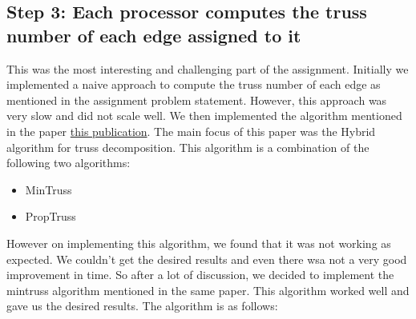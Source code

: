 \documentclass{article}
\begin{document}
\subsection{Step 3: Each processor computes the truss number of each edge assigned to it}

This was the most interesting and challenging part of the assignment. Initially we implemented a naive approach to compute the truss number of each edge as mentioned in the assignment problem statement. However, this approach was very slow and did not scale well. We then implemented the algorithm mentioned in the paper \href{https://link.springer.com/chapter/10.1007/978-3-319-96983-1_50}{this publication}. The main focus of this paper was the Hybrid algorithm for truss decomposition. This algorithm is a combination of the following two algorithms:
\begin{itemize}
    \item MinTruss
    \item PropTruss
\end{itemize}

However on implementing this algorithm, we found that it was not working as expected. We couldn't get the desired results and even there wsa not a very good improvement in time. So after a lot of discussion, we decided to implement the mintruss algorithm mentioned in the same paper. This algorithm worked well and gave us the desired results. The algorithm is as follows:

\end{document}
